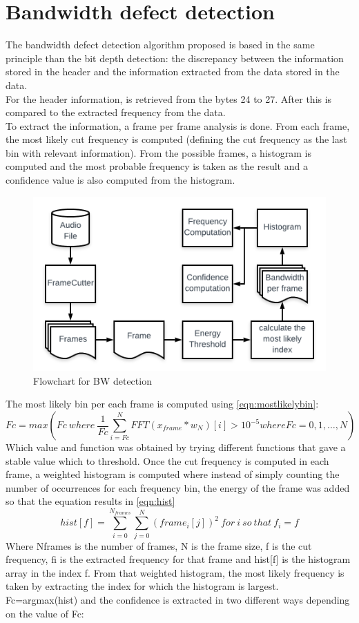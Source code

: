 \section{Bandwidth defect detection}
The bandwidth defect detection algorithm proposed is based in the same principle than the bit depth detection: the discrepancy between the 
information stored in the header and the information extracted from the data stored in the data. \\
For the header information, is retrieved from the bytes 24 to 27. After this is compared to the extracted frequency from the data. \\
To extract the information, a frame per frame analysis is done. From each frame, the most likely cut frequency is computed (defining the 
cut frequency as the last bin with relevant information). From the possible frames, a histogram is computed and the most probable frequency is 
taken as the result and a confidence value is also computed from the histogram. \\
\begin{figure}[!ht]
	\includegraphics[clip,width=\columnwidth]{Figures/BW_Flowchart.png}%
	\caption{Flowchart for BW detection}
	\label{fig:bwflow}
\end{figure}
The most likely bin per each frame is computed using \ref{eqn:mostlikelybin}:
\begin{equation}\label{eqn:mostlikelybin}
	Fc = max(Fc\ where\ \frac{1}{Fc}\sum_{i=Fc}^{N}FFT(x_{frame}*w_N)[i]>10^{-5} where Fc = 0,1,\dots,N)
\end{equation}
Which value and function was obtained by trying different functions that gave a stable value which to threshold. 
Once the cut frequency is computed in each frame, a weighted histogram is computed where instead of simply counting the number of occurrences 
for each frequency bin, the energy of the frame was added so that the equation results in \ref{eqn:hist}
\begin{equation}\label{eqn:hist}
	hist[f] = \sum_{i=0}^{N_{frames}}\sum_{j=0}^{N}(frame_i[j])^2\ for\ i\ so\ that\ f_i=f
\end{equation}
Where Nframes is the number of frames, N is the frame size, f is the cut frequency, fi is the extracted frequency for that frame and hist[f] 
is the histogram array in the index f.
From that weighted histogram, the most likely frequency is taken by extracting the index for which the histogram is largest.
Fc=argmax(hist) 
and the confidence is extracted in two different ways depending on the value of Fc:

